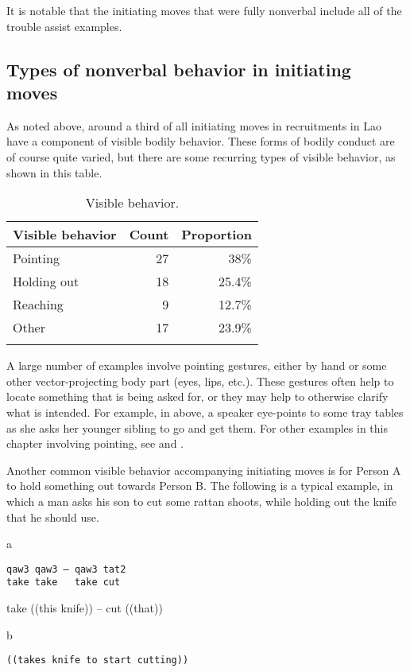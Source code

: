 \documentclass[output=paper]{langsci/langscibook}
\begin{document}
It is notable that the initiating moves that were fully nonverbal include all of the trouble assist examples.

\subsection{Types of nonverbal behavior in initiating moves}

As noted above, around a third of all initiating moves in recruitments in Lao have a component of visible bodily behavior. These forms of bodily conduct are of course quite varied, but there are some recurring types of visible behavior, as shown in this table.

\begin{table}
\begin{tabularx}{0.66\textwidth}{Xrr}
\lsptoprule
Visible behavior & Count & Proportion\\
\midrule
Pointing & 27 & 38\%\\
Holding out & 18 & 25.4\%\\
Reaching & 9 & 12.7\%\\
Other & 17 & 23.9\%\\
\lspbottomrule
\end{tabularx}
\caption{Visible behavior.}
\label{tab:enfield:3}
\end{table}

A large number of examples involve pointing gestures, either by hand or some other vector-projecting body part (eyes, lips, etc.). These gestures often help to locate something that is being asked for, or they may help to otherwise clarify what is intended. For example, in  above, a speaker eye-points to some tray tables as she asks her younger sibling to go and get them. For other examples in this chapter involving pointing, see  and .

Another common visible behavior accompanying initiating moves is for Person A to hold something out towards Person B. The following is a typical example, in which a man asks his son to cut some rattan shoots, while holding out the knife that he should use.

\vspace{-1mm}
%
\begin{mdframednoverticalspace}[style=firstfoc]
\begin{transbox}{1}{a}
\begin{verbatim}
qaw3 qaw3 – qaw3 tat2
take take   take cut
\end{verbatim}
take ((this knife)) -- cut ((that))
\end{transbox}
\end{mdframednoverticalspace}
%
\begin{mdframednoverticalspace}[style=secondfoc]
\begin{transbox}{2}{b}
\begin{verbatim}
((takes knife to start cutting))
\end{verbatim}
\end{transbox}
\end{mdframednoverticalspace}
\end{document}
